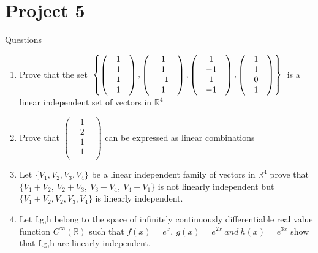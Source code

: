 \documentclass[45pt]{article}
\begin{document}
\section*{\Huge{Project 5}}
\Large{Questions}
\begin{enumerate}
  \item Prove that the set 
$ \\
\begin{Bmatrix}
  \begin{pmatrix}
    &1&\\&1&\\ &1&\\&1&\\
  \end{pmatrix},

  \begin{pmatrix}
    &1&\\&1&\\ &-1&\\&1&\\
  \end{pmatrix},
  \begin{pmatrix}
    &1&\\&-1&\\ &1&\\&-1&\\
  \end{pmatrix},
  \begin{pmatrix}
    &1&\\&1&\\ &0&\\&1&\\
  \end{pmatrix}
\end{Bmatrix}\\\\$
is a linear independent set of vectors in $\mathbb{R}^4$

\item Prove that 
$\begin{pmatrix} &1&\\&2&\\ &1&\\&1&\\ \end{pmatrix}$
can be expressed as linear combinations \\

\item Let $\{V_1, V_2, V_3, V_4\}$ be a linear independent family of vectors in $\mathbb{R}^4$ prove that 
$\{V_1+V_2,~ V_2+V_3,~ V_3+V_4,~ V_4+V_1\}$ is not linearly independent but $\{V_1 + V_2, V_2, V_3, V_4\}$ is linearly independent.\\$ $

\item Let f,g,h belong to the space of infinitely continuously differentiable real value function $C^{\infty} (\mathbb{R})$
 such that $f(x) = e^x,~ g(x)= e^{2x} ~and ~h(x)=e^{3x}$ show that f,g,h are linearly independent.
\end{enumerate}
\end{document}
